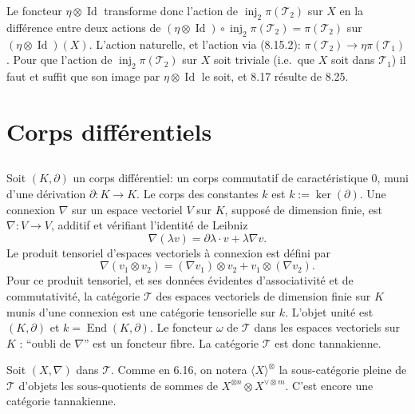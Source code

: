 \documentclass[12pt,a4paper]{article}
\theoremstyle{plain}
\theoremstyle{definition}
\DeclareMathOperator{\End}{End}
\DeclareMathOperator{\Id}{Id}
\DeclareMathOperator{\inj}{inj}
\begin{document}
Le foncteur $\eta \otimes \Id$ transforme donc l'action de $\inj_2 \pi(\mathcal{T}_2)$ sur $X$ en la différence entre deux actions de $(\eta \otimes \Id) \circ \inj_2 \pi(\mathcal{T}_2) = \pi(\mathcal{T}_2)$ sur $(\eta \otimes \Id)(X)$. L'action naturelle, et l'action via (8.15.2): $\pi(\mathcal{T}_2) \to \eta \pi(\mathcal{T}_1)$. Pour que l'action de $\inj_2 \pi(\mathcal{T}_2)$ sur $X$ soit triviale (i.e.~que $X$ soit dans $\mathcal{T}_1$) il faut et suffit que son image par $\eta \otimes \Id$ le soit, et 8.17 résulte de 8.25.

\section{Corps différentiels}

\subsection{}

Soit $(K, \partial)$ un corps différentiel: un corps commutatif de caractéristique 0, muni d'une dérivation $\partial : K \to K$. Le corps des constantes $k$ est $k := \ker(\partial)$. Une connexion $\nabla$ sur un espace vectoriel $V$ sur $K$, supposé de dimension finie, est $\nabla : V \to V$, additif et vérifiant l'identité de Leibniz
\[
\nabla(\lambda v) = \partial\lambda \cdot v + \lambda \nabla v.
\]
Le produit tensoriel d'espaces vectoriels à connexion est défini par
\[
\nabla(v_1 \otimes v_2) = (\nabla v_1) \otimes v_2 + v_1 \otimes (\nabla v_2).
\]
Pour ce produit tensoriel, et ses données évidentes d'associativité et de commutativité, la catégorie $\mathcal{T}$ des espaces vectoriels de dimension finie sur $K$ munis d'une connexion est une catégorie tensorielle sur $k$. L'objet unité est $(K, \partial)$ et $k = \End(K, \partial)$. Le foncteur $\omega$ de $\mathcal{T}$ dans les espaces vectoriels sur $K$ : ``oubli de $\nabla$'' est un foncteur fibre. La catégorie $\mathcal{T}$ est donc tannakienne.

Soit $(X, \nabla)$ dans $\mathcal{T}$. Comme en 6.16, on notera $\langle X \rangle^\otimes$ la sous-catégorie pleine de $\mathcal{T}$ d'objets les sous-quotients de sommes de $X^{\otimes n} \otimes X^{\vee \otimes m}$. C'est encore une catégorie tannakienne.

\subsection{}
\end{document}

